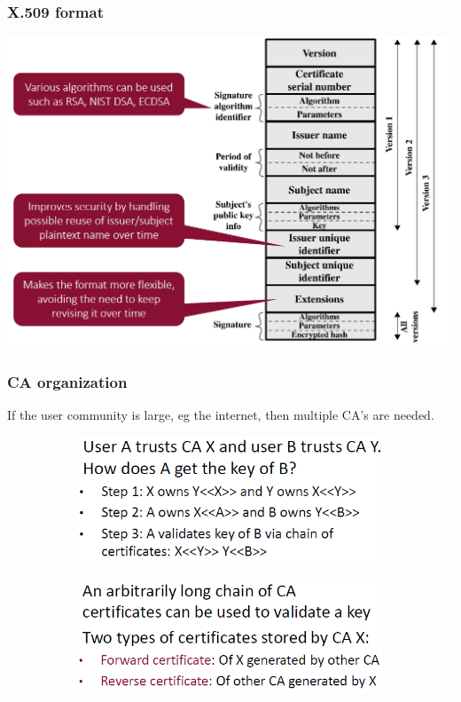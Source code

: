 \documentclass[12pt]{article}
\begin{document}
 \subsubsection{X.509 format}
 \includegraphics[width=\linewidth]{./slides/L5P5FORM.PNG}
 
 \subsubsection{CA organization}
 
 If the user community is large, eg the internet, then multiple CA's are needed.\\
 \noindent{}
 \begin{figure}[H]
 	\begin{subfigure}{.7\textwidth}
 		\includegraphics[width=.8\linewidth]{./slides/L5P5ORG1.PNG}
 	\end{subfigure}%
 	\begin{subfigure}{.7\textwidth}
 		\includegraphics[width=.8\linewidth]{./slides/L5P5ORG2.PNG}
 	\end{subfigure}
 \end{figure}
 
\end{document}
